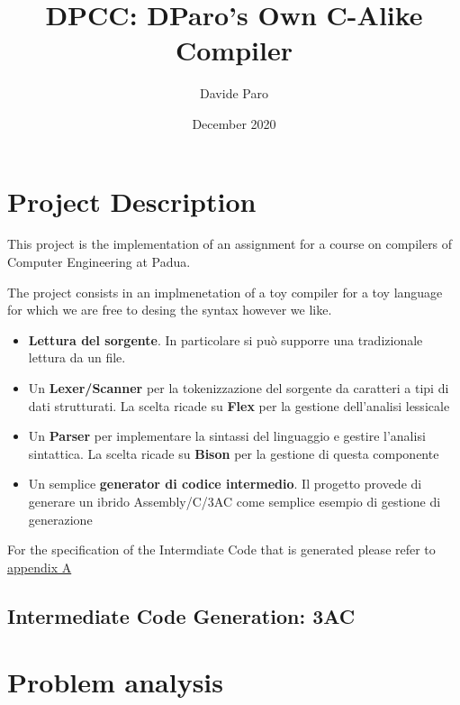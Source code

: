\documentclass[a4paper]{article}
\begin{document}
\title{DPCC: DParo's Own C-Alike Compiler}
\author{Davide Paro}
\date{December 2020}

\maketitle



\section*{Project Description}
This project is the implementation of an assignment for a course on compilers
of Computer Engineering at Padua.

The project consists in an implmenetation of a toy compiler for a toy language for
which we are free to desing the syntax however we like.


\begin{itemize}
\item \textbf{Lettura del sorgente}. In particolare si può supporre una tradizionale lettura da
  un file.
\item Un \textbf{Lexer/Scanner} per la tokenizzazione del sorgente da caratteri a tipi di dati strutturati. La scelta ricade su \textbf{Flex} per la gestione dell'analisi lessicale
\item Un \textbf{Parser} per implementare la sintassi del linguaggio e gestire l'analisi sintattica. La scelta ricade su \textbf{Bison} per la gestione di questa componente
\item Un semplice \textbf{generator di codice intermedio}. Il progetto provede di generare un ibrido Assembly/C/3AC come semplice esempio di gestione di generazione
\end{itemize}

For the specification of the Intermdiate Code that is generated please refer to \hyperref[appendix_a]{appendix A}

\subsection*{Intermediate Code Generation: 3AC}

\section*{Problem analysis}
\end{document}
